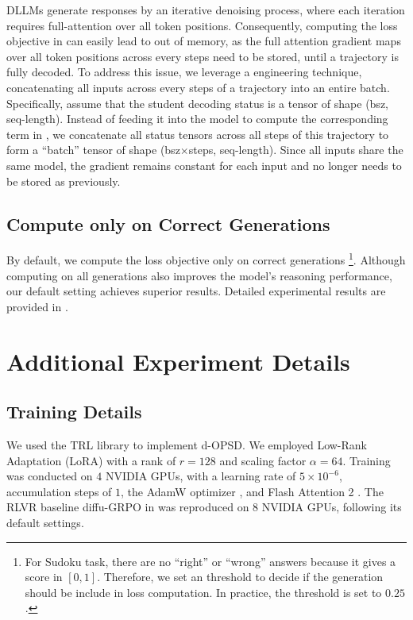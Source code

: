 \documentclass{article}
\begin{document}
DLLMs generate responses by an iterative denoising process, where each iteration requires full-attention over all token positions. Consequently, computing the loss objective in  can easily lead to out of memory, as the full attention gradient maps over all token positions across every steps need to be stored, until a trajectory is fully decoded. To address this issue, we leverage a engineering technique, concatenating all inputs across every steps of a trajectory into an entire batch. Specifically, assume that the student decoding status is a tensor of shape (bsz, seq-length). Instead of feeding it into the model to compute the corresponding term in , we concatenate all status tensors across all steps of this trajectory to form a ``batch'' tensor of shape (bsz$\times$steps, seq-length). Since all inputs share the same model, the gradient remains constant for each input and no longer needs to be stored as previously.

\subsection{Compute only on Correct Generations}


By default, we compute the loss objective  only on correct generations \footnote{For Sudoku task, there are no ``right'' or ``wrong'' answers because it gives a score in $[0, 1]$. Therefore, we set an threshold to decide if the generation should be include in loss computation. In practice, the threshold is set to $0.25$.}. Although computing on all generations also improves the model's reasoning performance, our default setting achieves superior results. Detailed experimental results are provided in .


\section{Additional Experiment Details}


\subsection{Training Details} \label{app4.1} 


We used the TRL library \citep{vonwerra2020trl} to implement d-OPSD. We employed Low-Rank Adaptation (LoRA) with a rank of $r = 128$ and scaling factor $\alpha = 64$. Training was conducted on $4$ NVIDIA GPUs, with a learning rate of $5 \times 10^{-6}$, accumulation steps of $1$, the AdamW optimizer \citep{loshchilov2017decoupled}, and Flash Attention 2 \citep{dao2023flashattention}. The RLVR baseline diffu-GRPO \citep{zhao2025d1} in  was reproduced on $8$ NVIDIA GPUs, following its default settings.
\end{document}
